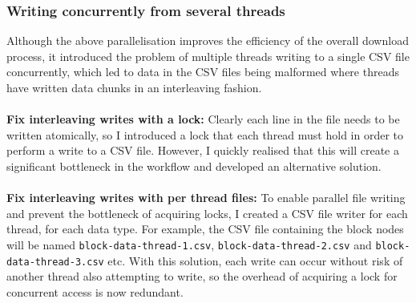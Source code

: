 \subsubsection{Writing concurrently from several threads}
Although the above parallelisation improves the efficiency of the overall download process, it introduced the problem of multiple threads writing to a single CSV file concurrently, which led to data in the CSV files being malformed where threads have written data chunks in an interleaving fashion. 
\\\\
\textbf{Fix interleaving writes with a lock:} Clearly each line in the file needs to be written atomically, so I introduced a lock that each thread must hold in order to perform a write to a CSV file. However, I quickly realised that this will create a significant bottleneck in the workflow and developed an alternative solution.
\\\\
\textbf{Fix interleaving writes with per thread files:} To enable parallel file writing and prevent the bottleneck of acquiring locks, I created a CSV file writer for each thread, for each data type. For example, the CSV file containing the block nodes will be named \texttt{block-data-thread-1.csv}, \texttt{block-data-thread-2.csv} and \texttt{block-data-thread-3.csv} etc. With this solution, each write can occur without risk of another thread also attempting to write, so the overhead of acquiring a lock for concurrent access is now redundant. 
\\\\

 
